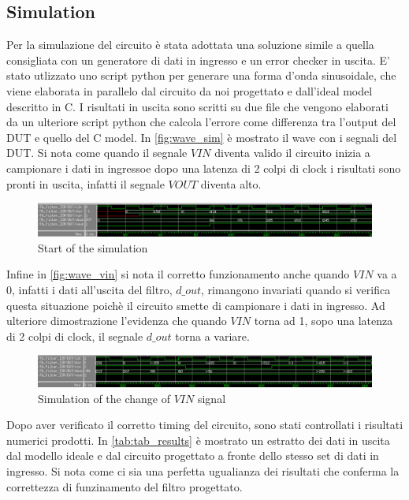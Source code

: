\subsection{Simulation}
Per la simulazione del circuito è stata adottata una soluzione simile a quella consigliata con un generatore di dati in ingresso e un error checker in uscita. E' stato utlizzato uno script python per generare una forma d'onda sinusoidale, che viene elaborata in parallelo dal circuito da noi progettato e dall'ideal model descritto in C. I risultati in uscita sono scritti su due file che vengono elaborati da un ulteriore script python che calcola l'errore come differenza tra l'output del DUT e quello del C model.
In \autoref{fig:wave_sim} è mostrato il wave con i segnali del DUT. Si nota come quando il segnale $VIN$ diventa valido il circuito inizia a campionare i dati in ingressoe dopo una latenza di 2 colpi di clock i risultati sono pronti in uscita, infatti il segnale $VOUT$ diventa alto.

\begin{figure}[h]
	\center
	\includegraphics[width=1\textwidth]{images/wave_start.png}
	\caption{Start of the simulation}
	\label{fig:wave_start}
\end{figure}

Infine in \autoref{fig:wave_vin} si nota il corretto funzionamento anche quando $VIN$ va a 0, infatti i dati all'uscita del filtro, $d\_out$, rimangono invariati quando si verifica questa situazione poichè il circuito smette di campionare i dati in ingresso. Ad ulteriore dimostrazione l'evidenza che quando $VIN$ torna ad 1, sopo una latenza di 2 colpi di clock, il segnale $d\_out$ torna a variare.

\begin{figure}[h]
	\center
	\includegraphics[width=1\textwidth]{images/wave_vin_0_1.png}
	\caption{Simulation of the change of $VIN$ signal}
	\label{fig:wave_vin}
\end{figure}

Dopo aver verificato il corretto timing del circuito, sono stati controllati i risultati numerici prodotti. In \autoref{tab:tab_results} è mostrato un estratto dei dati in uscita dal modello ideale e dal circuito progettato a fronte dello stesso set di dati in ingresso. Si nota come ci sia una perfetta ugualianza dei risultati che conferma la correttezza di funzinamento del filtro progettato.

